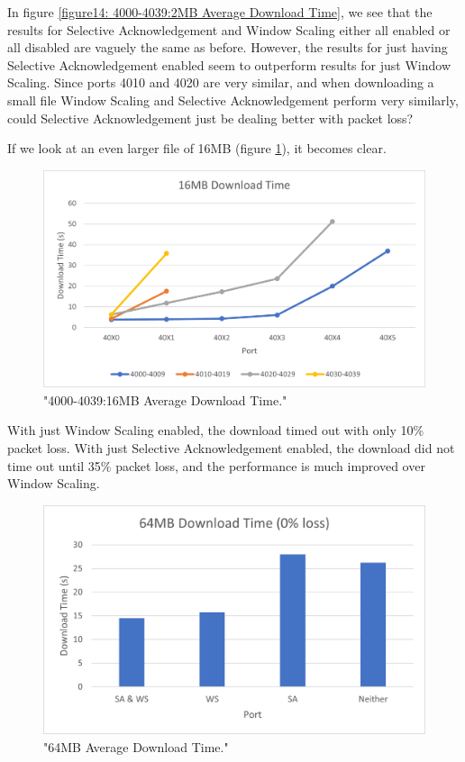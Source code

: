 \documentclass[12pt]{article}
\begin{document}
In figure \ref{figure14: 4000-4039:2MB Average Download Time}, we see that the results for Selective Acknowledgement and Window Scaling either all enabled or all disabled are vaguely the same as before.
However, the results for just having Selective Acknowledgement enabled seem to outperform results for just Window Scaling.
Since ports 4010 and 4020 are very similar, and when downloading a small file Window Scaling and Selective Acknowledgement perform very similarly, could Selective Acknowledgement just be dealing better with packet loss?

If we look at an even larger file of 16MB (figure \ref{figure15: 4000-4039:16MB Average Download Time}), it becomes clear.

\begin{figure}[!htbp]
  \centering
  \includegraphics[width=\linewidth]{4000-4039-16MB-download-time.png}
  \caption{"4000-4039:16MB Average Download Time."}
  \label{figure15: 4000-4039:16MB Average Download Time}
\end{figure}

With just Window Scaling enabled, the download timed out with only 10\% packet loss.
With just Selective Acknowledgement enabled, the download did not time out until 35\% packet loss, and the performance is much improved over Window Scaling.

\begin{figure}[!htbp]
  \centering
  \includegraphics[width=\linewidth]{64MB-no-loss-download-time.png}
  \caption{"64MB Average Download Time."}
  \label{figure16: 64MB Average Download Time}
\end{figure}
\end{document}

